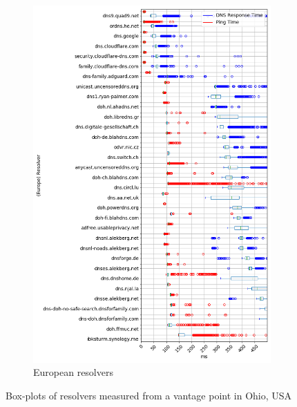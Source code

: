 \begin{figure}[t!]
\begin{subfigure}[t]{0.5\textwidth}
        \includegraphics[width=\linewidth]{figures/Ohio_Europe.png}
        \caption{European resolvers}
    \end{subfigure}

    \caption{Box-plots of resolvers measured from a vantage point in Ohio, USA}
\end{figure}




